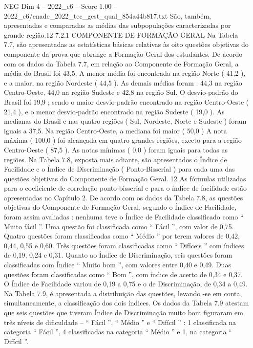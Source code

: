 \begin{textsample}{NEG Dim 4 – 2022\_c6 – Score 1.00 – 2022\_c6/enade\_2022\_tec\_gest\_qual\_854a44b817.txt}
São, também, apresentadas e comparadas as médias das subpopulações caracterizadas por grande região.12 7.2.1 COMPONENTE DE FORMAÇÃO GERAL Na Tabela 7.7, são apresentadas as estatísticas básicas relativas às oito questões objetivas do componente da prova que abrange a Formação Geral dos estudantes.
De acordo com os dados da Tabela 7.7, em relação ao Componente de Formação Geral, a média do Brasil foi 43,5.
A menor média foi encontrada na região Norte ( 41,2 ), e a maior, na região Nordeste ( 44,5 ).
As demais médias foram : 44,3 na região Centro-Oeste, 44,0 na região Sudeste e 42,8 na região Sul.
O desvio-padrão do Brasil foi 19,9 ; sendo o maior desvio-padrão encontrado na região Centro-Oeste ( 21,4 ), e o menor desvio-padrão encontrado na região Sudeste ( 19,0 ).
As medianas do Brasil e nas quatro regiões ( Sul, Nordeste, Norte e Sudeste ) foram iguais a 37,5.
Na região Centro-Oeste, a mediana foi maior ( 50,0 ) A nota máxima ( 100,0 ) foi alcançada em quatro grandes regiões, exceto para a região Centro-Oeste ( 87,5 ).
As notas mínimas ( 0,0 ) foram iguais para todas as regiões.
Na Tabela 7.8, exposta mais adiante, são apresentados o Índice de Facilidade e o Índice de Discriminação ( Ponto-Bisserial ) para cada uma das questões objetivas do Componente de Formação Geral. 12 As fórmulas utilizadas para o coeficiente de correlação ponto-bisserial e para o índice de facilidade estão apresentadas no Capítulo 2.
De acordo com os dados da Tabela 7.8, as questões objetivas do Componente de Formação Geral, segundo o Índice de Facilidade, foram assim avaliadas : nenhuma teve o Índice de Facilidade classificado como “ Muito fácil ”.
Uma questão foi classificada como “ Fácil ”, com valor de 0,75.
Quatro questões foram classificadas como “ Médio ” por terem valores de 0,42, 0,44, 0,55 e 0,60.
Três questões foram classificadas como “ Difíceis ” com índices de 0,19, 0,24 e 0,31.
Quanto ao Índice de Discriminação, seis questões foram classificadas com Índice “ Muito bom ”, com valores entre 0,40 e 0,49.
Duas questões foram classificadas como “ Bom ”, com índice de acerto de 0,34 e 0,37.
O Índice de Facilidade variou de 0,19 a 0,75 e o de Discriminação, de 0,34 a 0,49.
Na Tabela 7.9, é apresentada a distribuição das questões, levando -se em conta, simultaneamente, a classificação dos dois índices.
Os dados da Tabela 7.9 atestam que seis questões que tiveram Índice de Discriminação muito bom figuraram em três níveis de dificuldade – “ Fácil ”, “ Médio ” e “ Difícil ” : 1 classificada na categoria “ Fácil ”, 4 classificadas na categoria “ Médio ” e 1, na categoria “ Difícil ”.

\end{textsample}

